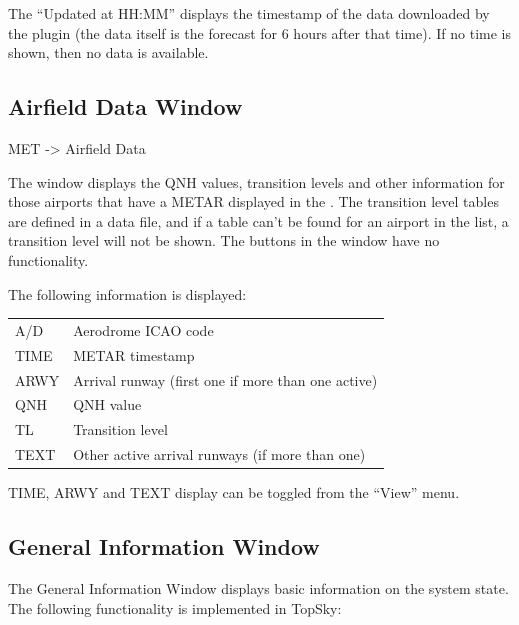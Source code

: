 \documentclass[a4paper,oneside,11pt]{memoir}
\begin{document}
\bigskip

The “Updated at HH:MM” displays the timestamp of the data downloaded by the plugin (the data itself is the forecast for 6 hours after that time). If no time is shown, then no data is available.

\subsection{Airfield Data Window}\label{win:adw}

 MET -> Airfield Data


The window displays the QNH values, transition levels and other information for those airports that have a METAR displayed in the . The transition level tables are defined in a data file, and if a table can’t be found for an airport in the list, a transition level will not be shown. The buttons in the window have no functionality.

\bigskip

The following information is displayed:

\begin{longtable}{p{2.5cm} p{10cm}}
  A/D   & Aerodrome ICAO code\\
  TIME  & METAR timestamp\\
  ARWY  & Arrival runway (first one if more than one active)\\
  QNH   & QNH value\\
  TL    & Transition level\\
  TEXT  & Other active arrival runways (if more than one)\\
\end{longtable}

TIME, ARWY and TEXT display can be toggled from the “View” menu.

\subsection{General Information Window}\label{win:geninfo}


The General Information Window displays basic information on the system state. The following functionality is implemented in TopSky:
\end{document}
